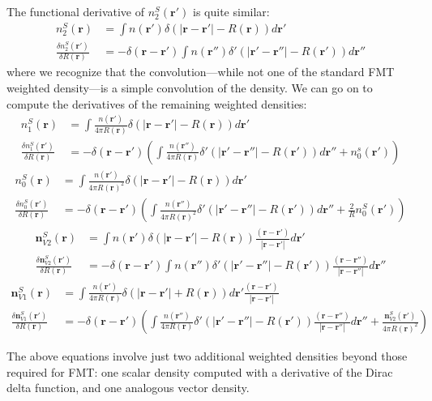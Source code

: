 \documentclass[letterpaper,twocolumn,amsmath,amssymb,jcp,10pt,aip]{revtex4-1}
\newcommand{\rr}{\textbf{r}}
\begin{document}
\begin{widetext}
The functional derivative of $n_2^S(\rr')$ is quite similar:
\begin{align}
  n_2^{S}(\rr) &= \int n(\rr') \delta(|\rr - \rr'| - R(\rr))d\mathbf
  r'\\
  \frac{\delta n_2^{S}(\rr')}{\delta R(\rr)} &= -\delta(\rr-\rr') \int n(\rr'')
  \delta'(|\rr'-\rr''| - R(\rr')) d\rr''
\end{align}
where we recognize that the convolution---while not one of the standard
FMT weighted density---is a simple convolution of the density.  We can
go on to compute the derivatives of the remaining weighted densities:
\begin{align}
  n_1^{S}(\rr) &= \int \frac{n(\rr')}{4\pi R(\rr)} \delta(|\rr - \rr'| - R(\rr))d\mathbf r'\\
    \frac{\delta n_1^{S}(\rr')}{\delta R(\rr)} &=
    -\delta(\rr-\rr') \left( \int \frac{n(\rr'')}{4\pi R(\rr)}
    \delta'(|\rr'-\rr''| - R(\rr')) d\rr''
    + n_0^s(\rr') \right)
\end{align}
\begin{align}
  n_0^{S}(\rr) &= \int \frac{n(\rr')}{4\pi R(\rr)^2} \delta(|\rr - \rr'| - R(\rr))d\mathbf r'\\
    \frac{\delta n_0^{S}(\rr')}{\delta R(\rr)}
    &= -\delta(\rr-\rr') \left( \int \frac{n(\rr'')}{4\pi R(\rr)^2}
    \delta'(|\rr'-\rr''| - R(\rr')) d\rr''
    +
    \frac{2}{R} n_0^S(\rr') \right)
\end{align}
\begin{align}
  \mathbf{n}_{V2}^{S}(\rr) &= \int n(\rr') \delta(|\rr - \rr'| - R(\rr))
  \frac{(\rr - \rr')}{|\rr - \rr'|} d \rr'\\
  \frac{\delta \mathbf{n}_{V2}^{S}(\rr')}{\delta R(\rr)} &= -\delta(\rr - \rr')
  \int n(\rr'') \delta'(|\rr' - \rr''| - R(\rr'))
  \frac{(\rr - \rr'')}{|\rr - \rr''|} d\rr''
\end{align}
\begin{align}
 \mathbf{n}_{V1}^{S}(\rr) &= \int \frac{n(\rr')}{4\pi R(\rr)} \delta(|\rr - \rr'| + R(\rr))d\mathbf r'
   \frac{(\rr - \rr')}{|\rr - \rr'|}\\
 \frac{\delta \mathbf{n}_{V1}^{S}(\rr')}{\delta R(\rr)}
 &= -\delta(\rr-\rr')\left(\int \frac{n(\rr'')}{4\pi R(\rr)}
   \delta'(|\rr'-\rr''| - R(\rr')) \frac{(\rr - \rr'')}{|\rr - \rr''|}  d\rr''
   + \frac{\mathbf{n}_{V2}^S(\rr')}{4\pi R(\rr)^2} \right)
\end{align}

The above equations involve just two additional weighted densities
beyond those required for FMT: one scalar density computed with a
derivative of the Dirac delta function, and one analogous vector
density.

\end{widetext}

\end{document}
